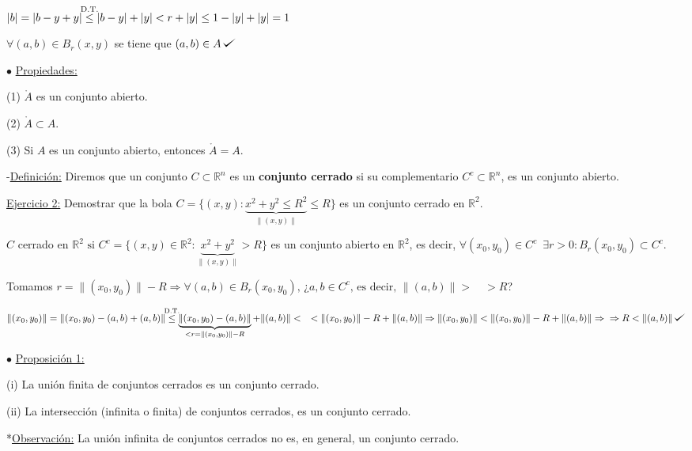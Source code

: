 \documentclass[12pt, titlepage]{article}
\def\checkmark{\tikz\fill[scale=0.4](0,.35) -- (.25,0) -- (1,.7) -- (.25,.15) -- cycle;}
\newcommand{\leqc}[1]{\stackrel{\mathclap{\normalfont\mbox{\scriptsize{#1}}}}{\leq}}
\newcommand{\R}{\mathbb{R}}
\newcommand{\spac}{\, \, \,}
\begin{document}
$|b| = |b - y + y| \leqc{D.T.} |b - y| +|y| < r + |y| \leq 1 - |y| + |y| = 1$
\vspace{3mm}

$\forall (a, b) \in B_r(x, y)$ se tiene que $(a, b) \in A \, \checkmark$
\vspace{5mm}


\noindent$\bullet$ \underline{Propiedades:}
\vspace{3mm}

(1) $\mathring{A}$ es un conjunto abierto.
\vspace{3mm}

(2) $\mathring{A} \subset A$.
\vspace{3mm}

(3) Si $A$ es un conjunto abierto, entonces $\mathring{A} = A$.
\vspace{5mm}

\noindent-\underline{Definición:} Diremos que un conjunto $C \subset \R^n$ es un \textbf{conjunto cerrado} si su complementario $C^c \subset \R^n$, es un conjunto abierto.
\vspace{3mm}

\underline{Ejercicio 2:} Demostrar que la bola $C = \{ (x, y) : \underbrace{x^2 + y^2 \leq R^2}_{\|(x, y)\|} \leq R\}$ es un conjunto cerrado en $\R^2$.
\vspace{3mm}

$C$  cerrado en $\R^2 \text{ si } C^c = \{(x, y) \in \R^2 : \underbrace{x^2 + y^2}_{\|(x, y)\|} > R\}$ es un conjunto abierto en $\R^2$, es decir, $\forall (x_0, y_0) \in C^c \spac \exists r > 0 : B_r (x_0, y_0) \subset C^c$.
\vspace{3mm}

Tomamos $r = \| (x_0, y_0) \| - R \Rightarrow \forall (a, b) \in B_r (x_0, y_0) \text{, ¿} a, b \in C^c \text{, es decir, } \| (a, b) \| > \quad > R$?
\vspace{2mm}

$\| (x_0, y_0) \| = \| (x_0, y_0) - (a, b) + (a, b) \| \leqc{D.T.} \underbrace{\| (x_0, y_0) - (a, b) \|}_{< r = \| (x_0, y_0) \| - R} + \| (a, b) \| < \quad < \| (x_0, y_0) \| - R + \| (a, b) \| \Rightarrow \| (x_0, y_0) \| < \| (x_0, y_0) \| - R + \| (a, b) \| \Rightarrow \\ \Rightarrow R < \| (a, b) \| \, \checkmark$
\vspace{5mm}

\noindent$\bullet$ \underline{Proposición 1:}
\vspace{3mm}

(i) La unión finita de conjuntos cerrados es un conjunto cerrado.
\vspace{3mm}

(ii) La intersección (infinita o finita) de conjuntos cerrados, es un conjunto \indent cerrado.
\vspace{3mm}

*\underline{Observación:} La unión infinita de conjuntos cerrados no es, en general, \indent un conjunto cerrado.
\vspace{3mm}
\end{document}
